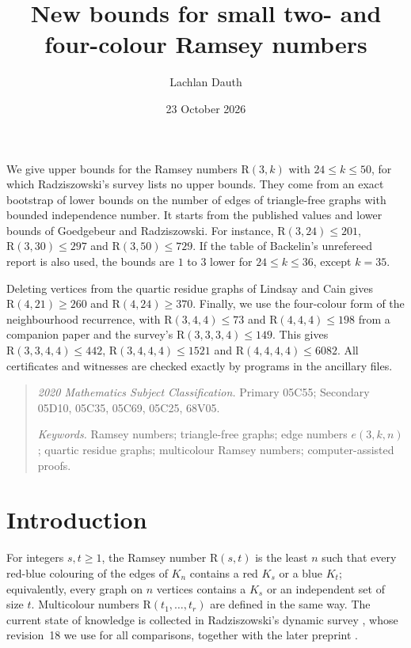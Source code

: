 \documentclass[11pt]{article}
\title{New bounds for small two- and\\ four-colour Ramsey numbers}
\author{Lachlan Dauth}
\date{23 October 2026}
\renewenvironment{abstract}{\small\begin{center}\bfseries\abstractname\end{center}%
  \list{}{\setlength{\leftmargin}{2.5em}\setlength{\rightmargin}{\leftmargin}%
  \setlength{\listparindent}{0pt}\setlength{\parsep}{0.6em plus 1pt}\setlength{\topsep}{0pt}}\item\relax}{\endlist}
\theoremstyle{spacedplain}
\theoremstyle{spaceddef}
\theoremstyle{spacedremark}
\newcommand{\R}{\mathrm{R}}
\begin{document}
\maketitle

\begin{abstract}
We give upper bounds for the Ramsey numbers $\R(3,k)$ with $24\le k\le 50$, for which Radziszowski's survey lists no upper bounds.
They come from an exact bootstrap of lower bounds on the number of edges of triangle-free graphs with bounded independence number.
It starts from the published values and lower bounds of Goedgebeur and Radziszowski.
For instance, $\R(3,24)\le 201$, $\R(3,30)\le 297$ and $\R(3,50)\le 729$.
If the table of Backelin's unrefereed report is also used, the bounds are $1$ to $3$ lower for $24\le k\le 36$, except $k=35$.

Deleting vertices from the quartic residue graphs of Lindsay and Cain gives $\R(4,21)\ge 260$ and $\R(4,24)\ge 370$.
Finally, we use the four-colour form of the neighbourhood recurrence, with $\R(3,4,4)\le 73$ and $\R(4,4,4)\le 198$ from a companion paper and the survey's $\R(3,3,3,4)\le 149$.
This gives $\R(3,3,4,4)\le 442$, $\R(3,4,4,4)\le 1521$ and $\R(4,4,4,4)\le 6082$.
All certificates and witnesses are checked exactly by programs in the ancillary files.
\end{abstract}

\begin{quote}\small
\textit{2020 Mathematics Subject Classification.} Primary 05C55; Secondary 05D10, 05C35, 05C69, 05C25, 68V05.

\textit{Keywords.} Ramsey numbers; triangle-free graphs; edge numbers $e(3,k,n)$; quartic residue graphs; multicolour Ramsey numbers; computer-assisted proofs.
\end{quote}

\section{Introduction}

For integers $s,t\ge 1$, the Ramsey number $\R(s,t)$ is the least $n$ such that every red-blue colouring of the edges of $K_n$ contains a red $K_s$ or a blue $K_t$; equivalently, every graph on $n$ vertices contains a $K_s$ or an independent set of size $t$.
Multicolour numbers $\R(t_1,\dots,t_r)$ are defined in the same way.
The current state of knowledge is collected in Radziszowski's dynamic survey \cite{Rad26}, whose revision~18 we use for all comparisons, together with the later preprint \cite{Yu26}.
\end{document}
